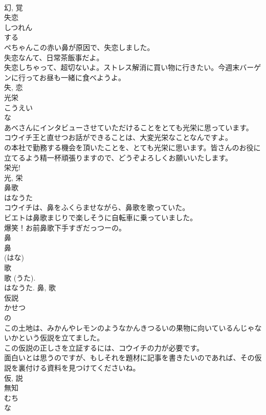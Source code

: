 \documentclass[8pt]{extreport}
\begin{document}
\begin{CJK}{UTF8}{min}
\\	幻, 覚	
\\	失恋	
\\	しつれん	
\\	する 
\\	ぺちゃんこの赤い鼻が原因で、失恋しました。	
\\	失恋なんて、日常茶飯事だよ。	
\\	失恋しちゃって、超切ないよ。ストレス解消に買い物に行きたい。今週末バーゲンに行ってお昼も一緒に食べようよ。	
\\	失, 恋	
\\	光栄	
\\	こうえい	
\\	な 
\\	あべさんにインタビューさせていただけることをとても光栄に思っています。	
\\	コウイチ王と直せつお話ができることは、大変光栄なことなんですよ。	
\\	の本社で勤務する機会を頂いたことを、とても光栄に思います。皆さんのお役に立てるよう精一杯頑張りますので、どうぞよろしくお願いいたします。	
\\	栄光! 
\\	光, 栄	
\\	鼻歌	
\\	はなうた	
\\	コウイチは、鼻をふくらませながら、鼻歌を歌っていた。	
\\	ビエトは鼻歌まじりで楽しそうに自転車に乗っていました。	
\\	爆笑！お前鼻歌下手すぎだっつーの。	
\\	鼻 
\\	鼻
\\	(はな) 
\\	歌
\\	歌 (うた). 
\\	はなうた.	鼻, 歌	
\\	仮説	
\\	かせつ	
\\	の 
\\	この土地は、みかんやレモンのようなかんきつるいの果物に向いているんじゃないかという仮説を立てました。	
\\	この仮説の正しさを立証するには、コウイチの力が必要です。	
\\	面白いとは思うのですが、もしそれを題材に記事を書きたいのであれば、その仮説を裏付ける資料を見つけてくださいね。	
\\	仮, 説	
\\	無知	
\\	むち	
\\	な 

\end{CJK}
\end{document}
